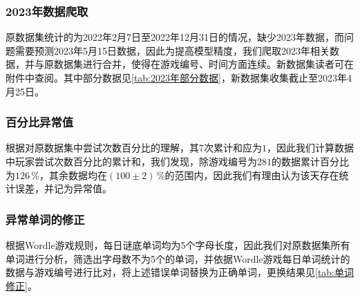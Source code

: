 \documentclass{MathModeling}
\begin{document}
	\subsubsection{2023年数据爬取}
	原数据集统计的为2022年2月7日至2022年12月31日的情况，缺少2023年数据，而问题需要预测2023年5月15日数据，因此为提高模型精度，我们爬取2023年相关数据，并与原数据集进行合并，使得在游戏编号、时间方面连续。新数据集读者可在附件中查阅。其中部分数据见\textcolor{blue}{\cref{tab:2023年部分数据}}，新数据集收集截止至2023年4月25日。
\begin{table}[H]
	\centering
	\caption{2023年部分数据}
	\label{tab:2023年部分数据}
\end{table}

	\subsubsection{百分比异常值}
	根据对原数据集中尝试次数百分比的理解，其7次累计和应为$1$，因此我们计算数据中玩家尝试次数百分比的累计和，我们发现，除游戏编号为$281$的数据累计百分比为$126\,\%$，其余数据均在$\left(100\pm2\right)\,\%$的范围内，因此我们有理由认为该天存在统计误差，并记为异常值。

	\subsubsection{异常单词的修正}
	根据Wordle游戏规则，每日谜底单词均为5个字母长度，因此我们对原数据集所有单词进行分析，筛选出字母数不为5个的单词，并依据Wordle游戏每日单词统计的数据与游戏编号进行比对，将上述错误单词替换为正确单词，更换结果见\textcolor{blue}{\cref{tab:单词修正}}。
\begin{table}[H]
	\centering
	\caption{单词修正}
	\label{tab:单词修正}
\end{table}
  
\end{document}
